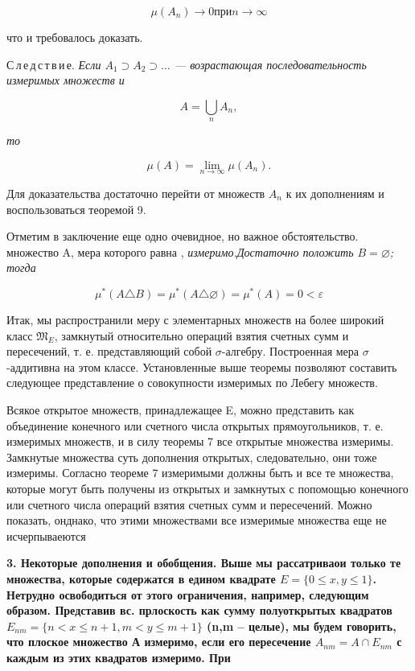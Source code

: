 \documentclass{article}
\begin{document}
 $$\mu (A_n)\rightarrow 0 \text{при}  n\rightarrow \infty$$

\noindent что и требовалось доказать.

С\,л\,е\,д\,с\,т\,в\,и\,е. \itshape Если \normalfont $A_1\supset A_2\supset\ldots$ --- \itshape возрастающая последовательность измеримых множеств и \normalfont

$$A=\bigcup\limits_n A_n,$$

\noindent \itshape то\normalfont

$$\mu(A)=\lim\limits_{n\rightarrow\infty} \mu (A_n).$$

Для доказательства достаточно перейти от множеств $A_n$ к их дополнениям и воспользоваться теоремой 9.

Отметим в заключение еще одно очевидное, но важное обстоятельство.  множество \normalfont A,  мера которого равна , \itshape измеримо.\normalfont Достаточно положить $B=\varnothing$; тогда

$$\mu^{*}(A\triangle B)=\mu^{*}(A\triangle\varnothing)=\mu^{*}(A)=0<\varepsilon$$

Итак, мы распространили меру с элементарных множеств на более широкий класс $\mathfrak{M}_E$, замкнутый относительно операций взятия счетных сумм и пересечений, т. е. представляющий собой $\sigma$-алгебру. Построенная мера $\sigma$-аддитивна на этом классе. Установленные выше теоремы позволяют составить следующее представление о совокупности измеримых по Лебегу множеств.

Всякое открытое множеств, принадлежащее E, можно представить как объединение конечного или счетного числа открытых прямоугольников, т. е. измеримых множеств, и в силу теоремы 7 все открытые множества измеримы. Замкнутые множества суть дополнения открытых, следовательно, они тоже измеримы. Согласно теореме 7 измеримыми должны быть и все те множества, которые могут быть получены из открытых и замкнутых с попомощью конечного или счетного числа операций взятия счетных сумм и пересечений. Можно показать, онднако, что этими множествами все измеримые множества еще не исчерпываеются

\bfseries3. Некоторые дополнения и обобщения. \normalfont Выше мы рассатриваои только те множества, которые содержатся в едином квадрате $E=\{0\leq x,y\leq 1\}$. Нетрудно освободиться от этого ограничения, например, следующим образом. Представив вс. прлоскость как сумму полуоткрытых квадратов $E_{nm}=\{n<x\leq n+1, m<y\leq m+1\}$ (n,m -- целые), мы будем говорить, что плоское множество А измеримо, если его пересечение $A_{nm}=A\cap E_{nm}$ с каждым из этих квадратов измеримо. При
\end{document}
